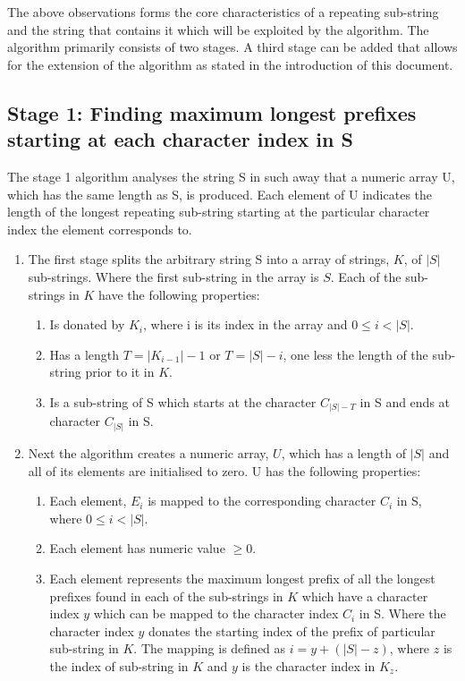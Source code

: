 \documentclass[12pt]{article}
\begin{document}
\begin{flushleft}
	The above observations forms the core characteristics of a repeating sub-string and the string that contains it which will be exploited by the algorithm. The algorithm primarily consists of two stages. A third stage can be added that allows for the extension of the algorithm as stated in the introduction of this document.
	
	\subsection{Stage 1: Finding maximum longest prefixes starting at each character index in S}
		The stage 1 algorithm analyses the string S in such away that a numeric array U, which has the same length as S, is produced. Each element of U indicates the length of the longest repeating sub-string starting at the particular character index the element corresponds to. 
	
		\begin{enumerate}	
		\item The first stage splits the arbitrary string S into a array of strings, $K$, of $|S|$ sub-strings. Where the first sub-string in the array is $S$.
		Each of the sub-strings in $K$ have the following properties:
			\begin{enumerate}
				\item Is donated by $K_{i}$, where i is its index in the array and $ 0 \le i < |S|$.
				\item Has a length $T = |K_{i-1}| - 1$ or $T = |S| - i$, one less the length of the sub-string prior to it in $K$.
				\item Is a sub-string of S which starts at the character $C_{|S| - T} $ in S and ends at character $C_{|S|}$ in S.
			\end{enumerate}
		
		\item Next the algorithm creates a numeric array, $U$, which has a length of $|S|$ and all of its elements are initialised to zero. 
		U has the following properties:
			\begin{enumerate}
				\item Each element, $E_{i}$ is mapped to the corresponding character $C_{i}$ in S, where $ 0 \le i < |S|$.
				\item Each element has numeric value $\ge 0$.
				\item Each element represents the maximum longest prefix of all the longest prefixes found in each of the sub-strings in $K$ which have a character index $y$ which can be mapped to the character index $C_{i}$ in S. Where the character index $y$ donates the starting index of the prefix of particular sub-string in $K$. The mapping is defined as $i = y + (|S| - z)$, where $z$ is the index of sub-string in $K$ and $y$ is the character index in $K_{z}$.  
				

\end{enumerate}
\end{enumerate}
\end{flushleft}
\end{document}
